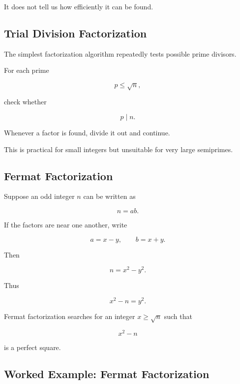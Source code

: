 It does not tell us how efficiently it can be found.

\subsection{Trial Division Factorization}
\label{subsec:trial-division-factorization}

The simplest factorization algorithm repeatedly tests possible prime divisors.

For each prime

\[ p\leq\sqrt n, \]

check whether

\[ p\mid n. \]

Whenever a factor is found, divide it out and continue.

This is practical for small integers but unsuitable for very large
semiprimes.

\subsection{Fermat Factorization}
\label{subsec:fermat-factorization}

Suppose an odd integer \(n\) can be written as

\[ n=ab. \]

If the factors are near one another, write

\[ a=x-y,\qquad b=x+y. \]

Then

\[ n=x^2-y^2. \]

Thus

\[ x^2-n=y^2. \]

Fermat factorization searches for an integer \(x\geq\sqrt n\) such that

\[ x^2-n \]

is a perfect square.

\subsection{Worked Example: Fermat Factorization}
\label{subsec:worked-fermat-factorization}


